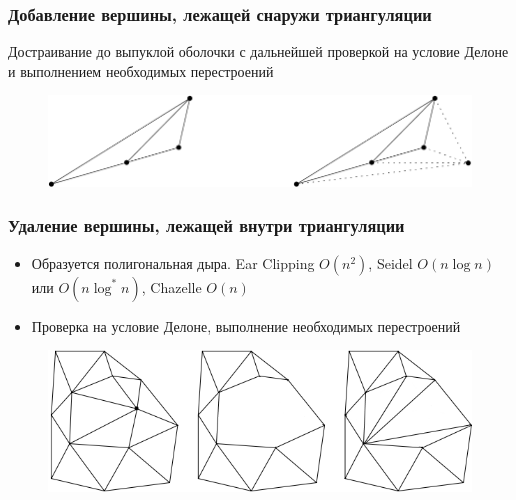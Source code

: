 \documentclass[10pt, unicode]{beamer}
\begin{document}
    \begin{frame}
        \frametitle{Добавление вершины, лежащей снаружи триангуляции}
        Достраивание до выпуклой оболочки с дальнейшей проверкой на условие Делоне и выполнением необходимых перестроений
        \begin{figure}[H]
            \centering
            \includegraphics[scale=0.5]{AddOutOfTriangulationVertex.png}
        \end{figure}
    \end{frame}
    \begin{frame}
        \frametitle{Удаление вершины, лежащей внутри триангуляции}
        \begin{itemize}
            \item Образуется полигональная дыра. Ear Clipping $O(n^2)$, Seidel $O(n\log n)$ или $O(n\log^*n)$, 
            Chazelle $O(n)$
            \item Проверка на условие Делоне, выполнение необходимых перестроений
        \end{itemize}
        \begin{figure}[H]
            \centering
            \includegraphics[scale=0.5]{DeleteInsideVertex.png}
        \end{figure}
    \end{frame}
\end{document}

